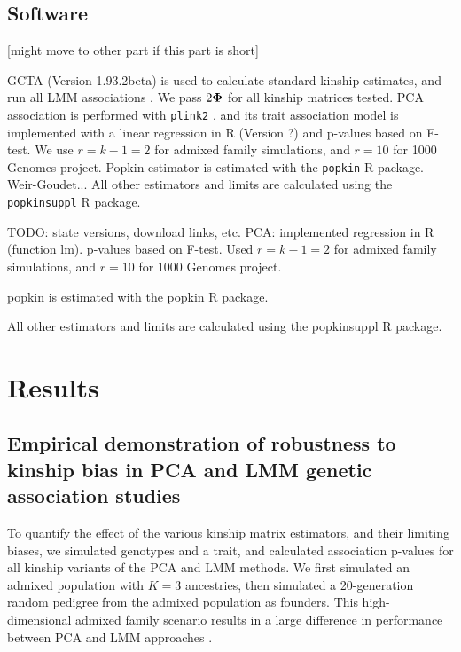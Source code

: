 \documentclass[11pt]{article}
\newcommand{\kinMat}{%
  \ensuremath{%
    \mathbf{\Phi}
  }%
  \xspace%
}%
\begin{document}
\subsection{Software}
[might move to other part if this part is short]

GCTA (Version 1.93.2beta) is used to calculate standard kinship estimates, and run all LMM associations \citep{yang_gcta:_2011, yang_advantages_2014}. We pass $2 \kinMat$ for all kinship matrices tested. 
PCA association is performed with \texttt{plink2} \citep{chang_second-generation_2015}, and its trait association model is implemented with a linear regression in R (Version ?) and p-values based on F-test. We use $r=k-1=2$ for admixed family simulations, and $r=10$ for 1000 Genomes project.
Popkin estimator is estimated with the \texttt{popkin} R package. Weir-Goudet... 
All other estimators and limits are calculated using the \texttt{popkinsuppl} R package.

TODO: state versions, download links, etc.
PCA: implemented regression in R (function lm).
p-values based on F-test.
Used $r=k-1=2$ for admixed family simulations, and $r=10$ for 1000 Genomes project.

popkin is estimated with the popkin R package.

All other estimators and limits are calculated using the popkinsuppl R package.

\section{Results}

\subsection{Empirical demonstration of robustness to kinship bias in PCA and LMM genetic association studies}

To quantify the effect of the various kinship matrix estimators, and their limiting biases, we simulated genotypes and a trait, and calculated association p-values for all kinship variants of the PCA and LMM methods.
We first simulated an admixed population with $K=3$ ancestries, then simulated a 20-generation random pedigree from the admixed population as founders.
This high-dimensional admixed family scenario results in a large difference in performance between PCA and LMM approaches \citep{yao_testing_2019}.

\graphicspath{ {../data/sim-admix-n1000-m100000-k3-f0.3-s0.5-mc100-h0.8-g20-fes/} }
\end{document}
